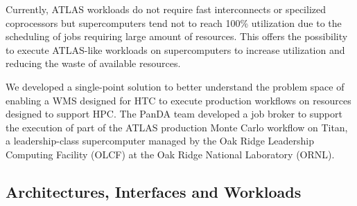 Currently, ATLAS workloads do not require fast interconnects or specilized
coprocessors but supercomputers tend not to reach 100\% utilization due to
the scheduling of jobs requiring large amount of resources. This offers the
possibility to execute ATLAS-like workloads on supercomputers to increase
utilization and reducing the waste of available resources.

We developed a single-point solution to better understand the problem space
of enabling a WMS designed for HTC to execute production workflows on
resources designed to support HPC\@. The PanDA team developed a job broker to
support the execution of part of the ATLAS production Monte Carlo workflow on
Titan, a leadership-class supercomputer managed by the Oak Ridge Leadership
Computing Facility (OLCF) at the Oak Ridge National Laboratory (ORNL).

\subsection{Architectures, Interfaces and Workloads}
\label{ssec:panda-titan}



